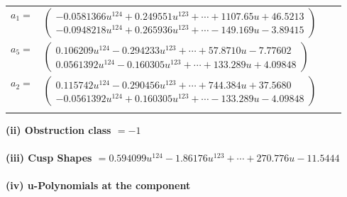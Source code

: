 \documentclass[1p]{elsarticle_modified}
\theoremstyle{definition}
\begin{document}
\begin{tabular}{m{7pt} m{180pt} m{7pt} m{180pt} }
\flushright $a_{1}=$&$\begin{pmatrix}-0.0581366 u^{124}+0.249551 u^{123}+\cdots+1107.65 u+46.5213\\-0.0948218 u^{124}+0.265936 u^{123}+\cdots-149.169 u-3.89415\end{pmatrix}$ \\
\flushright $a_{5}=$&$\begin{pmatrix}0.106209 u^{124}-0.294233 u^{123}+\cdots+57.8710 u-7.77602\\0.0561392 u^{124}-0.160305 u^{123}+\cdots+133.289 u+4.09848\end{pmatrix}$ \\
\flushright $a_{2}=$&$\begin{pmatrix}0.115742 u^{124}-0.290456 u^{123}+\cdots+744.384 u+37.5680\\-0.0561392 u^{124}+0.160305 u^{123}+\cdots-133.289 u-4.09848\end{pmatrix}$\\&\end{tabular}
\flushleft \textbf{(ii) Obstruction class $= -1$}\\~\\
\flushleft \textbf{(iii) Cusp Shapes $= 0.594099 u^{124}-1.86176 u^{123}+\cdots+270.776 u-11.5444$}\\~\\
\newpage\renewcommand{\arraystretch}{1}
\flushleft \textbf{(iv) u-Polynomials at the component}\newline \\
\end{document}

